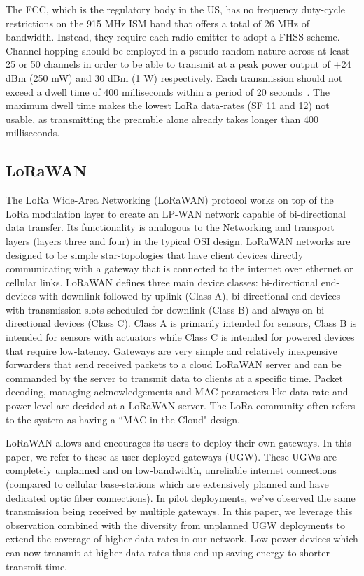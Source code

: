 The \ac{FCC}, which is the regulatory body in the \ac{US}, has no frequency
duty-cycle restrictions on the 915 MHz \ac{ISM} band that offers a total of 26
MHz of bandwidth. Instead, they require each radio emitter to adopt a
\ac{FHSS} scheme. Channel hopping should be employed in a pseudo-random nature
across at least 25 or 50 channels in order to be able to transmit at a peak
power output of +24 dBm (250 mW) and 30 dBm (1 W) respectively. Each
transmission should not exceed a dwell time of 400 milliseconds within a
period of 20 seconds~\cite{FCC15, FCCCompliance}. The maximum dwell time makes
the lowest \ac{LoRa} data-rates (\ac{SF} 11 and 12) not usable, as
transmitting the preamble alone already takes longer than 400 milliseconds.

\subsection{LoRaWAN}
\label{sec:lorawan}

The LoRa Wide-Area Networking (LoRaWAN) protocol works on top of the LoRa
modulation layer to create an LP-WAN network capable of bi-directional data
transfer. Its functionality is analogous to the Networking and transport
layers (layers three and four) in the typical OSI design. LoRaWAN networks
are designed to be simple star-topologies that have client devices directly
communicating with a gateway that is connected to the internet over ethernet
or cellular links. LoRaWAN defines three main device classes: bi-directional
end-devices with downlink followed by uplink (Class A), bi-directional
end-devices with transmission slots scheduled for downlink (Class B) and
always-on bi-directional devices (Class C). Class A is primarily intended for
sensors, Class B is intended for sensors with actuators while Class C is
intended for powered devices that require low-latency. Gateways are very
simple and relatively inexpensive forwarders that send received packets to a
cloud LoRaWAN server and can be commanded by the server to transmit data to
clients at a specific time. Packet decoding, managing acknowledgements and
MAC parameters like data-rate and power-level are decided at a LoRaWAN
server. The LoRa community often refers to the system as having a
``MAC-in-the-Cloud" design.

LoRaWAN allows and encourages its users to deploy their own gateways. In this
paper, we refer to these as user-deployed gateways (UGW). These UGWs are
completely unplanned and on low-bandwidth, unreliable internet connections
(compared to cellular base-stations which are extensively planned and have
dedicated optic fiber connections). In pilot deployments, we've observed the
same transmission being received by multiple gateways. In this paper, we
leverage this observation combined with the diversity from unplanned UGW
deployments to extend the coverage of higher data-rates in our network.
Low-power devices which can now transmit at higher data rates thus end up
saving energy to shorter transmit time.